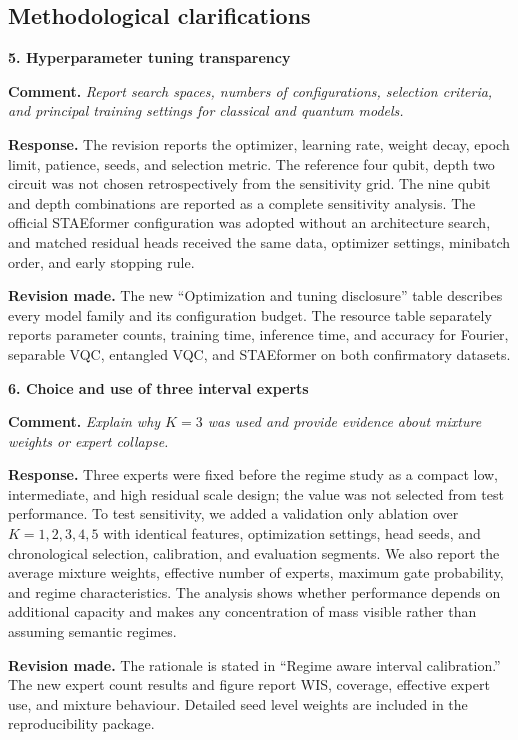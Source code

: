 \documentclass[11pt]{article}
\newcommand{\comment}[1]{\textbf{Comment.} \emph{#1}}
\newcommand{\response}[1]{\textbf{Response.} #1}
\newcommand{\change}[1]{\textbf{Revision made.} #1}
\begin{document}
\subsection*{Methodological clarifications}

\textbf{5. Hyperparameter tuning transparency}

\comment{Report search spaces, numbers of configurations, selection criteria, and principal training settings for classical and quantum models.}

\response{The revision reports the optimizer, learning rate, weight decay, epoch limit, patience, seeds, and selection metric. The reference four qubit, depth two circuit was not chosen retrospectively from the sensitivity grid. The nine qubit and depth combinations are reported as a complete sensitivity analysis. The official STAEformer configuration was adopted without an architecture search, and matched residual heads received the same data, optimizer settings, minibatch order, and early stopping rule.}

\change{The new ``Optimization and tuning disclosure'' table describes every model family and its configuration budget. The resource table separately reports parameter counts, training time, inference time, and accuracy for Fourier, separable VQC, entangled VQC, and STAEformer on both confirmatory datasets.}

\textbf{6. Choice and use of three interval experts}

\comment{Explain why $K=3$ was used and provide evidence about mixture weights or expert collapse.}

\response{Three experts were fixed before the regime study as a compact low, intermediate, and high residual scale design; the value was not selected from test performance. To test sensitivity, we added a validation only ablation over $K=1,2,3,4,5$ with identical features, optimization settings, head seeds, and chronological selection, calibration, and evaluation segments. We also report the average mixture weights, effective number of experts, maximum gate probability, and regime characteristics. The analysis shows whether performance depends on additional capacity and makes any concentration of mass visible rather than assuming semantic regimes.}

\change{The rationale is stated in ``Regime aware interval calibration.'' The new expert count results and figure report WIS, coverage, effective expert use, and mixture behaviour. Detailed seed level weights are included in the reproducibility package.}
\end{document}
